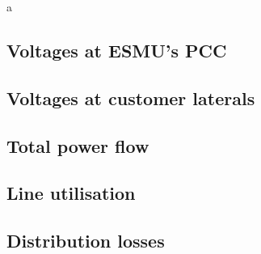 
a
\subsection{Voltages at ESMU's PCC}
\label{ch1:subsec:voltages-at-esmu}



\subsection{Voltages at customer laterals}
\label{ch1:subsec:voltages-at-customers}



\subsection{Total power flow}
\label{ch1:subsec:total-power-flow}



\subsection{Line utilisation}
\label{ch1:subsec:line-utilisation}



\subsection{Distribution losses}
\label{ch1:subsec:losses}





